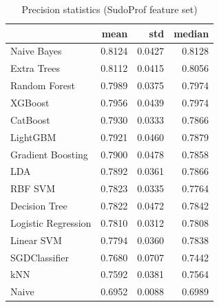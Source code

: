 \begin{table}
\caption{Precision statistics (SudoProf feature set)}
\label{tab:precision_SudoProf_stats}
\begin{tabular}{lrrr}
\toprule
 & mean & std & median \\
\midrule
Naive Bayes & 0.8124 & 0.0427 & 0.8128 \\
Extra Trees & 0.8112 & 0.0415 & 0.8056 \\
Random Forest & 0.7989 & 0.0375 & 0.7974 \\
XGBoost & 0.7956 & 0.0439 & 0.7974 \\
CatBoost & 0.7930 & 0.0333 & 0.7866 \\
LightGBM & 0.7921 & 0.0460 & 0.7879 \\
Gradient Boosting & 0.7900 & 0.0478 & 0.7858 \\
LDA & 0.7892 & 0.0361 & 0.7866 \\
RBF SVM & 0.7823 & 0.0335 & 0.7764 \\
Decision Tree & 0.7822 & 0.0472 & 0.7842 \\
Logistic Regression & 0.7810 & 0.0312 & 0.7808 \\
Linear SVM & 0.7794 & 0.0360 & 0.7838 \\
SGDClassifier & 0.7680 & 0.0707 & 0.7442 \\
kNN & 0.7592 & 0.0381 & 0.7564 \\
Naive & 0.6952 & 0.0088 & 0.6989 \\
\bottomrule
\end{tabular}
\end{table}
